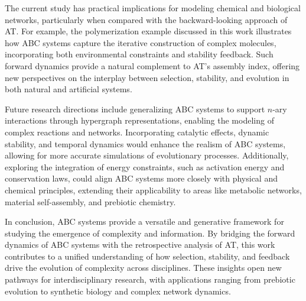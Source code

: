 \documentclass[entropy,article,submit,pdftex,oneauthor]{Definitions/mdpi}
\begin{document}
The current study has practical implications for modeling chemical and biological networks, particularly when compared with the backward-looking approach of AT. For example, the polymerization example discussed in this work illustrates how ABC systems capture the iterative construction of complex molecules, incorporating both environmental constraints and stability feedback. Such forward dynamics provide a natural complement to AT’s assembly index, offering new perspectives on the interplay between selection, stability, and evolution in both natural and artificial systems.

Future research directions include generalizing ABC systems to support \( n \)-ary interactions through hypergraph representations, enabling the modeling of complex reactions and networks. Incorporating catalytic effects, dynamic stability, and temporal dynamics would enhance the realism of ABC systems, allowing for more accurate simulations of evolutionary processes. Additionally, exploring the integration of energy constraints, such as activation energy and conservation laws, could align ABC systems more closely with physical and chemical principles, extending their applicability to areas like metabolic networks, material self-assembly, and prebiotic chemistry.

In conclusion, ABC systems provide a versatile and generative framework for studying the emergence of complexity and information. By bridging the forward dynamics of ABC systems with the retrospective analysis of AT, this work contributes to a unified understanding of how selection, stability, and feedback drive the evolution of complexity across disciplines. These insights open new pathways for interdisciplinary research, with applications ranging from prebiotic evolution to synthetic biology and complex network dynamics.
\end{document}
